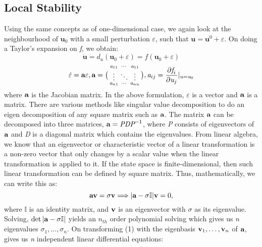 \subsection{Local Stability}
Using the same concepts as of one-dimensional case, we again look at the neighbourhood of $ \textbf{u}_{0} $ with a small perturbation $ \varepsilon $, such that $ \textbf{u}=\textbf{u}^{0}+\varepsilon $. On doing a Taylor’s expansion on \textit{f}, we obtain:
\begin{equation}
\dot{\mathbf{u}}=d_{u}(\mathbf{u}_{0}+\varepsilon)=\mathit{f}(\mathbf{u}_{0}+\varepsilon)
\end{equation}
\begin{equation}
\dot{\varepsilon}= \normalfont \textbf{a}\varepsilon, \normalfont \textbf{a} = \bigl(\begin{smallmatrix} \textit{a}_{11}&\cdots &\textit{a}_{11} \\ \vdots&\ddots &\vdots \\ \textit{a}_{n1}&\cdots &\textit{a}_{nn} \end{smallmatrix}\bigr), \textit{a}_{ij}=\dfrac{\partial\textit{f}_{i}}{\partial\textit{u}_{j}}\vert_{\mathit{u}=\mathit{u}_{0}}
\end{equation}
where $\normalfont \textbf{a}$ is the Jacobian matrix. In the above formulation, $ \varepsilon $ is a vector and $\normalfont \textbf{a}$ is a matrix. 
There are various methods like singular value decomposition to do an eigen decomposition of any square matrix such as $\normalfont \textbf{a}$. The matrix $\normalfont \textbf{a}$  can be decomposed into three matrices, $\normalfont \textbf{a}=\textit{PD}\textit{P}^{-1}$, where \textit{P} consists of eigenvectors of $\normalfont \textbf{a}$ and \textit{D} is a diagonal matrix which contains the eigenvalues. From linear algebra, we know that an eigenvector or characteristic vector of a linear transformation is a non-zero vector that only changes by a scalar value when the linear transformation is applied to it. If the state space is finite-dimensional, then such linear transformation can be defined by square matrix. Thus, mathematically, we can write this as:
\begin{equation}\label{eq:19}
\normalfont \textbf{av}= \sigma\normalfont \textbf{v}\Longrightarrow\vert\normalfont \textbf{a} - \sigma\mathbb{I}\vert\normalfont \textbf{v}=0,
\end{equation}
where $ \mathbb{I} $ is an identity matrix, and $\normalfont\textbf{v}$ is an eigenvector with $\sigma$ as its eigenvalue. Solving, $ \det\vert\normalfont \textbf{a} - \sigma\mathbb{I}\vert $ yields an $ \textit{n}_{th} $ order polynomial solving which gives us \textit{n} eigenvalues $ {\sigma_{1}, \dots , \sigma_{n}} $. On transforming (1) with the eigenbasis $ {\normalfont \textbf{v}_{1}, \dots, \normalfont \textbf{v}_{n}} $ of $\normalfont \textbf{a}$, gives us \textit{n} independent linear differential equations:
